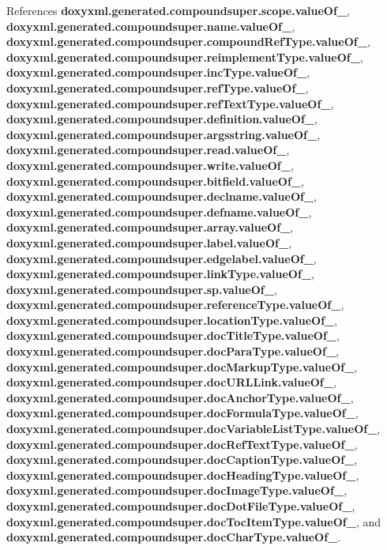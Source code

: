 References {\bf doxyxml.\+generated.\+compoundsuper.\+scope.\+value\+Of\+\_\+}, {\bf doxyxml.\+generated.\+compoundsuper.\+name.\+value\+Of\+\_\+}, {\bf doxyxml.\+generated.\+compoundsuper.\+compound\+Ref\+Type.\+value\+Of\+\_\+}, {\bf doxyxml.\+generated.\+compoundsuper.\+reimplement\+Type.\+value\+Of\+\_\+}, {\bf doxyxml.\+generated.\+compoundsuper.\+inc\+Type.\+value\+Of\+\_\+}, {\bf doxyxml.\+generated.\+compoundsuper.\+ref\+Type.\+value\+Of\+\_\+}, {\bf doxyxml.\+generated.\+compoundsuper.\+ref\+Text\+Type.\+value\+Of\+\_\+}, {\bf doxyxml.\+generated.\+compoundsuper.\+definition.\+value\+Of\+\_\+}, {\bf doxyxml.\+generated.\+compoundsuper.\+argsstring.\+value\+Of\+\_\+}, {\bf doxyxml.\+generated.\+compoundsuper.\+read.\+value\+Of\+\_\+}, {\bf doxyxml.\+generated.\+compoundsuper.\+write.\+value\+Of\+\_\+}, {\bf doxyxml.\+generated.\+compoundsuper.\+bitfield.\+value\+Of\+\_\+}, {\bf doxyxml.\+generated.\+compoundsuper.\+declname.\+value\+Of\+\_\+}, {\bf doxyxml.\+generated.\+compoundsuper.\+defname.\+value\+Of\+\_\+}, {\bf doxyxml.\+generated.\+compoundsuper.\+array.\+value\+Of\+\_\+}, {\bf doxyxml.\+generated.\+compoundsuper.\+label.\+value\+Of\+\_\+}, {\bf doxyxml.\+generated.\+compoundsuper.\+edgelabel.\+value\+Of\+\_\+}, {\bf doxyxml.\+generated.\+compoundsuper.\+link\+Type.\+value\+Of\+\_\+}, {\bf doxyxml.\+generated.\+compoundsuper.\+sp.\+value\+Of\+\_\+}, {\bf doxyxml.\+generated.\+compoundsuper.\+reference\+Type.\+value\+Of\+\_\+}, {\bf doxyxml.\+generated.\+compoundsuper.\+location\+Type.\+value\+Of\+\_\+}, {\bf doxyxml.\+generated.\+compoundsuper.\+doc\+Title\+Type.\+value\+Of\+\_\+}, {\bf doxyxml.\+generated.\+compoundsuper.\+doc\+Para\+Type.\+value\+Of\+\_\+}, {\bf doxyxml.\+generated.\+compoundsuper.\+doc\+Markup\+Type.\+value\+Of\+\_\+}, {\bf doxyxml.\+generated.\+compoundsuper.\+doc\+U\+R\+L\+Link.\+value\+Of\+\_\+}, {\bf doxyxml.\+generated.\+compoundsuper.\+doc\+Anchor\+Type.\+value\+Of\+\_\+}, {\bf doxyxml.\+generated.\+compoundsuper.\+doc\+Formula\+Type.\+value\+Of\+\_\+}, {\bf doxyxml.\+generated.\+compoundsuper.\+doc\+Variable\+List\+Type.\+value\+Of\+\_\+}, {\bf doxyxml.\+generated.\+compoundsuper.\+doc\+Ref\+Text\+Type.\+value\+Of\+\_\+}, {\bf doxyxml.\+generated.\+compoundsuper.\+doc\+Caption\+Type.\+value\+Of\+\_\+}, {\bf doxyxml.\+generated.\+compoundsuper.\+doc\+Heading\+Type.\+value\+Of\+\_\+}, {\bf doxyxml.\+generated.\+compoundsuper.\+doc\+Image\+Type.\+value\+Of\+\_\+}, {\bf doxyxml.\+generated.\+compoundsuper.\+doc\+Dot\+File\+Type.\+value\+Of\+\_\+}, {\bf doxyxml.\+generated.\+compoundsuper.\+doc\+Toc\+Item\+Type.\+value\+Of\+\_\+}, and {\bf doxyxml.\+generated.\+compoundsuper.\+doc\+Char\+Type.\+value\+Of\+\_\+}.




